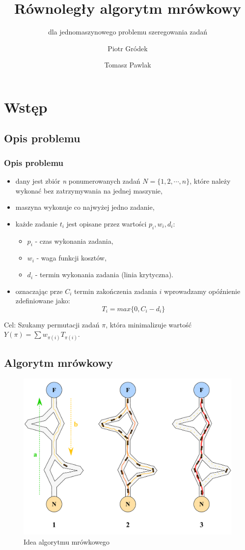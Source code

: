 \documentclass[11pt,a4paper]{beamer}
\title{Równoległy algorytm mrówkowy}
\subtitle{dla jednomaszynowego problemu szeregowania zadań}
\author{Piotr Gródek \and Tomasz Pawlak}
\institute
{
Instytut Informatyki\\
Uniwersytet Wrocławski
}
\begin{document}
\frame{\titlepage}

\section{Wstęp}
\subsection{Opis problemu}

\begin{frame}
\frametitle{Opis problemu}
\begin{itemize}
\item dany jest zbiór \textit{n} ponumerowanych zadań $N = \{1,2,\cdots,n\}$, które należy wykonać bez zatrzymywania na jednej maszynie,   
\item maszyna wykonuje co najwyżej jedno zadanie, 
\item każde zadanie $t_i$ jest opisane przez wartości $p_i, w_i, d_i$:
\begin{itemize}
\item $p_i$ - czas wykonania zadania,
\item $w_i$ - waga funkcji kosztów,
\item $d_i$ - termin wykonania zadania (linia krytyczna).
\end{itemize} 
\item oznaczając prze $C_{i}$ termin zakończenia zadania $i$ wprowadzamy opóźnienie zdefiniowane jako: $$T_{i} = max \{ 0, C_{i} - d_{i} \}$$
\end{itemize} 
\begin{block}{Cel:}
{\color{blue}Szukamy permutacji zadań $\pi$, która minimalizuje wartość $Y(\pi) = \sum w_{\pi(i)} T_{\pi(i)}$}.
\end{block}
\end{frame}

\subsection{Algorytm mrówkowy}
\begin{frame}
\begin{figure}
 \centering
  \includegraphics[width=\textwidth]{aco}
  \caption {Idea algorytmu mrówkowego}
\end{figure}
\end{frame}
\end{document}
